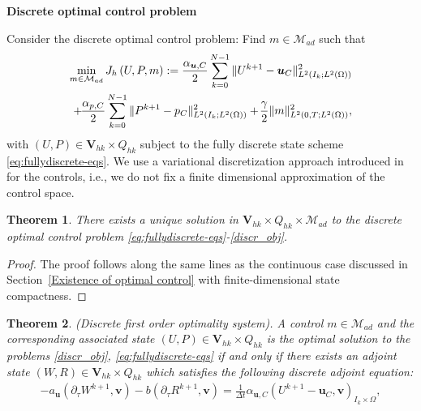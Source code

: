 \documentclass{amsart}
\newcommand{\jjl}[1]{\textcolor{purple}{JJL: #1}}
\newcommand{\ta}{\tau}
\newtheorem{theorem}{Theorem}[section]
\newcommand{\mc}[1]{\mathcal{#1}}
\newcommand{\LRp}[1]{\left( #1 \right)}
\begin{document}
{\bf Discrete optimal control problem} {Consider the discrete optimal control problem: Find $m \in \mathcal{M}_{ad}$ such that 
	\begin{align}
	\label{discr_obj} 
    \min_{m \in \mathcal{M}_{ad}} J_h \LRp{U, P, m} := \frac{\alpha_{\boldsymbol{u}, C} }{2} \sum_{k=0}^{N-1} \|U^{k+1} - \boldsymbol{u}_C\|_{L^{2}(I_k; L^2(\Omega))}^2
    \\ \notag
		  +\hspace{-0.45mm} \frac{\alpha_{p, C} }{2}\sum_{k=0}^{N-1} \|P^{k+1} - p_C \|_{L^{2}(I_k; L^2(\Omega))}^2
          +\hspace{-0.45mm} \frac{\gamma}{2} \|m\|_{L^{2}(0,T; L^2(\Omega))}^2,
	\end{align}
    with $(U, P) \in \boldsymbol{V}_{hk} \times Q_{hk}$ 
	subject to the fully discrete state scheme \eqref{eq:fullydiscrete-eqs}.
    We use a variational discretization approach introduced in \cite{MR2122182} for the controls, i.e., we do not fix a finite dimensional approximation of the control space. 
\begin{theorem}
	There exists a unique solution in $\boldsymbol{V}_{hk} \times Q_{hk} \times \mathcal{M}_{ad}$ to the discrete optimal control problem \eqref{eq:fullydiscrete-eqs}-\eqref{discr_obj}.
\end{theorem}
\begin{proof}
	The proof follows along the same lines as the continuous case discussed in Section~\ref{Existence of optimal control} with finite-dimensional state compactness.
\end{proof}
\begin{theorem}
	(Discrete first order optimality system). A control $m \in \mc{M}_{ad}$ and the corresponding associated state $(U, P) \in \boldsymbol{V}_{hk} \times Q_{hk}$ is the optimal solution to the problems \eqref{discr_obj}, \eqref{eq:fullydiscrete-eqs} if and only if there exists an adjoint state $(W, R) \in \boldsymbol{V}_{hk} \times Q_{hk}$ which satisfies the following discrete adjoint equation:
	\begin{subequations}
		\label{eq:fullydiscreteadj-eqs11}
		\begin{align}
			\label{eq:fullydiscreteadj-eq12}
			-a_{\boldsymbol{u}} \LRp{\partial_\ta W^{k+1}, \boldsymbol{v}} - b \LRp{\partial_\ta R^{k+1}, \boldsymbol{v}} = \frac{1}{\Delta t} \alpha_{\boldsymbol{u}, C} (U^{k+1} - \boldsymbol{u}_{C}, \boldsymbol{v})_{I_k \times \Omega},  

\end{align}
\end{subequations}
\end{theorem}}
\end{document}
